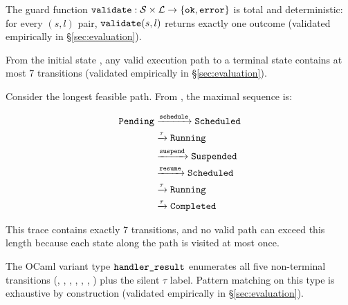 \begin{prop}\label{prop:deterministic-guards}
The guard function $\identifiable{validate} : \mathcal{S} \times \mathcal{L} \to \{\identifiable{ok}, \identifiable{error}\}$ is total and deterministic: for every $(s, l)$ pair, $\identifiable{validate}(s, l)$ returns exactly one outcome (validated empirically in \S\ref{sec:evaluation}).
\end{prop}

\begin{prop}\label{prop:max-path}
From the initial state , any valid execution path to a terminal state contains at most 7 transitions (validated empirically in \S\ref{sec:evaluation}).
\end{prop}

\begin{prop}\label{prop:max-path-proof}
Consider the longest feasible path. From , the maximal sequence is:

\[
\begin{aligned}
\identifiable{Pending}
& \xrightarrow{\identifiable{schedule}} \identifiable{Scheduled} \\
& \xrightarrow{\tau} \identifiable{Running} \\
& \xrightarrow{\identifiable{suspend}} \identifiable{Suspended} \\
& \xrightarrow{\identifiable{resume}} \identifiable{Scheduled} \\
& \xrightarrow{\tau} \identifiable{Running} \\
& \xrightarrow{\tau} \identifiable{Completed}
\end{aligned}
\]

This trace contains exactly 7 transitions, and no valid path can exceed this length because each state along the path is visited at most once.
\end{prop}

\begin{prop}\label{prop:type-safety}
The OCaml variant type $\identifiable{handler\_result}$ enumerates all five non-terminal transitions (, , , , , , ) plus the silent $\tau$ label. Pattern matching on this type is exhaustive by construction (validated empirically in \S\ref{sec:evaluation}).
\end{prop}

